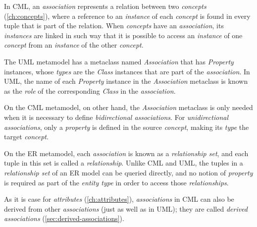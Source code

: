 In CML,
an \emph{association} represents a relation between two \emph{concepts} (\ref{ch:concepts}),
where a reference to an \emph{instance} of each \emph{concept} is found in every tuple that is part of the relation.
When \emph{concepts} have an \emph{association},
its \emph{instances} are linked in such way that
it is possible to access an \emph{instance} of one \emph{concept}
from an \emph{instance} of the other \emph{concept}.

The UML \cite{uml} metamodel has a metaclass named \emph{Association} that has \emph{Property} instances,
whose \emph{types} are the \emph{Class} instances that are part of the \emph{association}.
In UML, the name of each \emph{Property} instance in the \emph{Association} metaclass
is known as the \emph{role} of the corresponding \emph{Class} in the \emph{association}.

On the CML metamodel, on other hand,
the \emph{Association} metaclass is only needed
when it is necessary to define \emph{bidirectional associations}.
For \emph{unidirectional associations},
only a \emph{property} is defined in the source \emph{concept},
making its \emph{type} the target \emph{concept}.

On the ER \cite{er} metamodel,
each \emph{association} is known as a \emph{relationship set},
and each tuple in this set is called a \emph{relationship}.
Unlike CML and UML,
the tuples in a \emph{relationship set} of an ER model
can be queried directly,
and no notion of \emph{property} is required as part of the \emph{entity type}
in order to access those \emph{relationships}.

As it is case for \emph{attributes} (\ref{ch:attributes}),
\emph{associations} in CML can also be derived from other \emph{associations}
(just as well as in UML);
they are called \emph{derived associations} (\ref{sec:derived-associations}).

